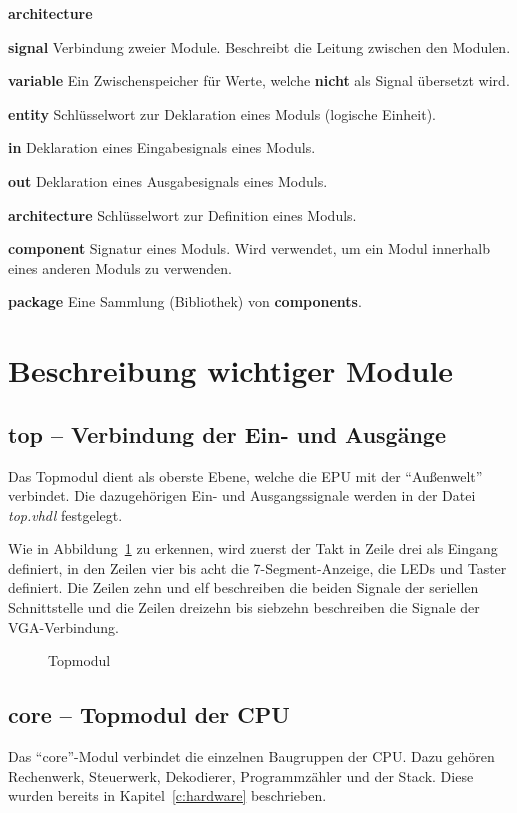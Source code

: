 \begin{labeling}{\textbf{architecture}}
\item[\textbf{signal}] Verbindung zweier Module. Beschreibt die Leitung zwischen
	den Modulen.
\item[\textbf{variable}] Ein Zwischenspeicher für Werte, welche \textbf{nicht}
	als Signal übersetzt wird.
\item[\textbf{entity}] Schlüsselwort zur Deklaration eines Moduls (logische Einheit).
\item[\textbf{in}] Deklaration eines Eingabesignals eines Moduls.
\item[\textbf{out}]	Deklaration eines Ausgabesignals eines Moduls.
\item[\textbf{architecture}] Schlüsselwort zur Definition eines Moduls.
\item[\textbf{component}] Signatur eines Moduls. Wird verwendet, um ein Modul
	innerhalb eines anderen Moduls zu verwenden.
\item[\textbf{package}]	Eine Sammlung (Bibliothek) von \textbf{components}.
\end{labeling}
\pagebreak
\section{Beschreibung wichtiger Module}
\subsection{top -- Verbindung der Ein- und Ausgänge}
\label{s:top}
Das Topmodul dient als oberste Ebene, welche die \ac{EPU} mit der "`Außenwelt"'
verbindet. Die dazugehörigen Ein- und Ausgangssignale werden in der Datei
\textit{top.vhdl} festgelegt.

Wie in Abbildung~\ref{code:top} zu erkennen, wird zuerst der Takt in Zeile drei
als Eingang definiert, in den Zeilen vier bis acht die 7-Segment-Anzeige, die
LEDs und Taster definiert. Die Zeilen zehn und elf beschreiben die beiden
Signale der seriellen Schnittstelle und die Zeilen dreizehn bis siebzehn
beschreiben die Signale der VGA-Verbindung.
\begin{figure}[htb]

\caption{Topmodul}
\label{code:top}
\end{figure}
\pagebreak
\subsection{core -- Topmodul der CPU}
\label{s:core}
Das "`core"'-Modul verbindet die einzelnen Baugruppen der CPU\@. Dazu gehören
Rechenwerk, Steuerwerk, Dekodierer, Programmzähler und der Stack. Diese wurden
bereits in Kapitel~\ref{c:hardware} beschrieben.

